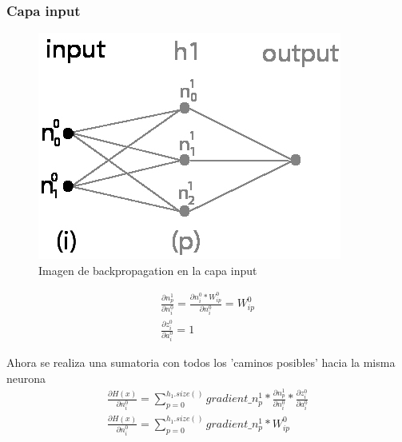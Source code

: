 \subsubsection{Capa input}

\begin{figure}[H]
	\centering
	\includegraphics[scale=0.35]{imagenes/nn_1_capa_input.jpg}  
	\caption{Imagen de backpropagation en la capa input}
	\label{fig:nn_1_capa_input}
\end{figure}

\begin{gather}
	\frac{\partial n^1_p }{\partial n^0_i } = \frac{\partial n^0_i * W^0_{ip} }{\partial n^0_i } = W^0_{ip} \\
	\frac{\partial z^0_i }{\partial a^0_i } = 1
\end{gather}

Ahora se realiza una sumatoria con todos los 'caminos posibles' hacia la misma neurona
\begin{gather}
	\frac{\partial H(x) }{\partial n^0_i } = \sum_{p=0}^{h_1.size()} gradient\_n^1_p * \frac{\partial n^1_p }{\partial n^0_i } * \frac{\partial z^0_i }{\partial a^0_i }  \\
	\frac{\partial H(x) }{\partial n^0_i } = \sum_{p=0}^{h_1.size()}  gradient\_n^1_p * W^0_{ip}
\end{gather}

